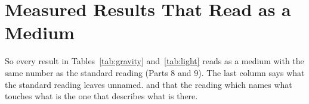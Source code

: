 \section{Measured Results That Read as a Medium}\label{sec:measured}

 So every result in Tables~\ref{tab:gravity} and~\ref{tab:light} reads as a medium with the same number as the standard reading (Parts 8 and 9).\nocite{hamilton2008} The last column says what the standard reading leaves unnamed.  and that the reading which names what touches what is the one that describes what is there.

